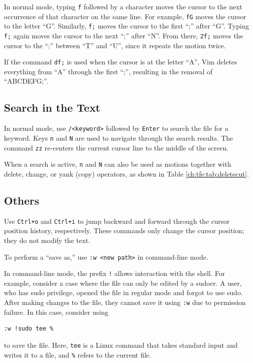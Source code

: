 In normal mode, typing \verb|f| followed by a character moves the cursor to the next occurrence of that character on the same line. For example, \verb|fG| moves the cursor to the letter ``G''. Similarly, \verb|f;| moves the cursor to the first ``;'' after ``G''. Typing \verb|f;| again moves the cursor to the next ``;'' after ``N''. From there, \verb|2f;| moves the cursor to the ``;'' between ``T'' and ``U'', since it repeats the motion twice.

If the command \verb|df;| is used when the cursor is at the letter ``A'', Vim deletes everything from ``A'' through the first ``;'', resulting in the removal of ``ABCDEFG;''.

\subsection{Search in the Text}

In normal mode, use \verb|/<keyword>| followed by \verb|Enter| to search the file for a keyword. Keys \verb|n| and \verb|N| are used to navigate through the search results. The command \verb|zz| re-centers the current cursor line to the middle of the screen. 

When a search is active, \verb|n| and \verb|N| can also be used as motions together with delete, change, or yank (copy) operators, as shown in Table \ref{ch:tfe:tab:deletecut}.

\subsection{Others}

Use \verb|Ctrl+o| and \verb|Ctrl+i| to jump backward and forward through the cursor position history, respectively. These commands only change the cursor position; they do not modify the text.

To perform a ``save as,'' use \verb|:w <new path>| in command-line mode.

In command-line mode, the prefix \verb|!| allows interaction with the shell. For example, consider a case where the file can only be edited by a sudoer. A user, who has sudo privilege, opened the file in regular mode and forgot to use sudo. After making changes to the file, they cannot save it using \verb|:w| due to permission failure. In this case, consider using
\begin{lstlisting}
:w !sudo tee %
\end{lstlisting}
to save the file. Here, \verb|tee| is a Linux command that takes standard input and writes it to a file, and \verb|%| refers to the current file.

